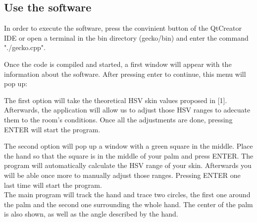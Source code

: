 \documentclass{article}
\begin{document}
\subsection{Use the software}
In order to execute the software, press the convinient button of the QtCreator IDE or open a terminal in the bin directory (gecko/bin) and enter the command "./gecko.cpp". 

Once the code is compiled and started, a first window will appear with the information about the software. After pressing enter to continue, this menu will pop up: 
\begin{center}
\end{center}

\vspace{1cm}
The first option will take the theoretical HSV skin values proposed in [1]. Afterwards, the application will allow us to adjust those HSV ranges to adecuate them to the room's conditions. 
Once all the adjustments are done, pressing ENTER will start the program. 

The second option will pop up a window with a green square in the middle. Place the hand so that the square is in the middle of your palm and press ENTER. The program will automatically calculate the HSV range of your skin. Afterwards you will be able once more to manually adjust those ranges. Pressing ENTER one last time will start the program. 
\\
 
The main program will track the hand and trace two circles, the first one around the palm and the second one surrounding the whole hand. The center of the palm is also shown, as well as the angle described by the hand. 
\end{document}
